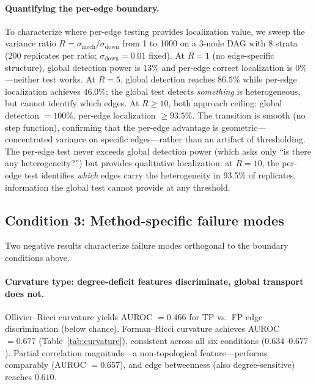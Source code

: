 \documentclass[11pt]{article}
\begin{document}
\paragraph{Quantifying the per-edge boundary.}
To characterize where per-edge testing provides localization value, we sweep the variance ratio $R = \sigma_{\mathrm{mech}} / \sigma_{\mathrm{down}}$ from 1 to 1000 on a 3-node DAG with 8 strata (200 replicates per ratio; $\sigma_{\mathrm{down}} = 0.01$ fixed).
At $R = 1$ (no edge-specific structure), global detection power is $13\%$ and per-edge correct localization is $0\%$---neither test works.
At $R = 5$, global detection reaches $86.5\%$ while per-edge localization achieves $46.0\%$; the global test detects \emph{something} is heterogeneous, but cannot identify which edges.
At $R \geq 10$, both approach ceiling: global detection $= 100\%$, per-edge localization $\geq 93.5\%$.
The transition is smooth (no step function), confirming that the per-edge advantage is geometric---concentrated variance on specific edges---rather than an artifact of thresholding.
The per-edge test never exceeds global detection power (which asks only ``is there any heterogeneity?'') but provides qualitative localization: at $R = 10$, the per-edge test identifies \emph{which} edges carry the heterogeneity in 93.5\% of replicates, information the global test cannot provide at any threshold.

\subsection{Condition 3: Method-specific failure modes}
\label{sec:res-failures}

Two negative results characterize failure modes orthogonal to the boundary conditions above.

\paragraph{Curvature type: degree-deficit features discriminate, global transport does not.}
Ollivier--Ricci curvature yields AUROC $= 0.466$ for TP vs.\ FP edge discrimination (below chance).
Forman--Ricci curvature achieves AUROC $= 0.677$ (Table~\ref{tab:curvature}), consistent across all six conditions ($0.634$--$0.677$).
Partial correlation magnitude---a non-topological feature---performs comparably (AUROC $= 0.657$), and edge betweenness (also degree-sensitive) reaches $0.610$.
\end{document}
